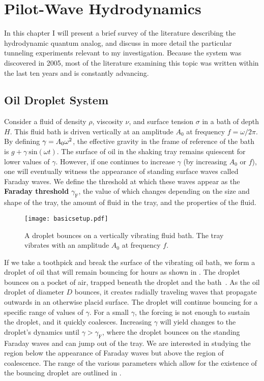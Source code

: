 \chapter{Pilot-Wave Hydrodynamics}
\label{Ch1}

In this chapter I will present a brief survey of the literature describing the hydrodynamic quantum analog, and discuss in more detail the particular tunneling experiments relevant to my investigation. Because the system was discovered in 2005, most of the literature examining this topic was written within the last ten years and is constantly advancing.


\section{Oil Droplet System}
	    \label{parameters}
	       Consider a fluid of density $\rho$, viscosity $\nu$, and surface tension $\sigma$ in a bath of depth $H$. This fluid bath is driven vertically at an amplitude $A_0$ at frequency $f=\omega/{2\pi}$. By defining $\mathnormal{\gamma}=A_0\omega^2$, the effective gravity in the frame of reference of the bath is $g+\gamma~\mathrm{sin}(\omega t)$. The surface of oil in the shaking tray remains quiescent for lower values of $\gamma$. However, if one continues to increase $\gamma$ (by increasing $A_0$ or $f$), one will eventually witness the appearance of standing surface waves called Faraday waves. We define the threshold at which these waves appear as the \textbf{Faraday threshold} $\gamma_\mathrm{F}$, the value of which changes depending on the size and shape of the tray, the amount of fluid in the tray, and the properties of the fluid. 
	       
	   \begin{figure}[h]
	       \centering
	    \texttt{[image: basicsetup.pdf]}
	     \caption{A droplet bounces on a vertically vibrating fluid bath. The tray vibrates with an amplitude $A_0$ at frequency $f$.}
	 \label{basic}
	\end{figure}
	       
	    If we take a toothpick and break the surface of the vibrating oil bath, we form a droplet of oil that will remain bouncing for hours as shown in . The droplet bounces on a pocket of air, trapped beneath the droplet and the bath~. As the oil droplet of diameter $D$ bounces, it creates radially traveling waves that propagate outwards in an otherwise placid surface. The droplet will continue bouncing for a specific range of values of $\gamma$. For a small $\gamma$, the forcing is not enough to sustain the droplet, and it quickly coalesces. Increasing $\gamma$ will yield changes to the droplet's dynamics until $\gamma > \gamma_\mathrm{F}$, where the droplet bounces on the standing Faraday waves and can jump out of the tray. We are interested in studying the region below the appearance of Faraday waves but above the region of coalescence. The range of the various parameters which allow for the existence of the bouncing droplet are outlined in . 
	      
